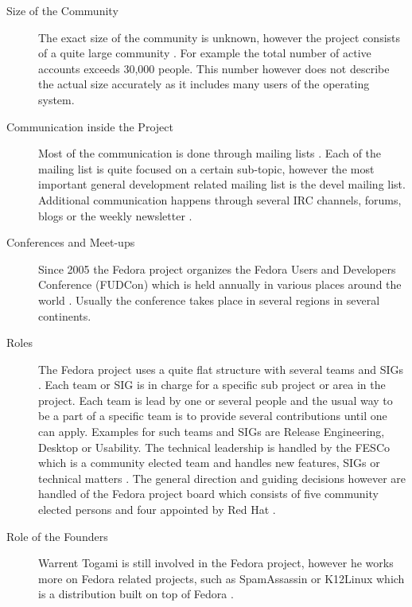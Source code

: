 \begin{description}

  \item[Size of the Community] The exact size of the community is unknown,
    however the project consists of a quite large community
    \cite{FedoraStatistics}. For example the total number of active accounts
    exceeds 30,000 people. This number however does not describe the actual
    size accurately as it includes many users of the operating system.

  \item[Communication inside the Project] Most of the communication is done
    through mailing lists \cite{FedoraAbout,FedoraJoin,FedoraSIG}. Each of
    the mailing list is quite focused on a certain sub-topic, however the
    most important general development related mailing list is the devel
    mailing list. Additional communication happens through several \ac{IRC}
    channels, forums, blogs or the weekly newsletter
    \cite{FedoraFWN,FedoraCommunicating}.

  \item[Conferences and Meet-ups] Since 2005 the Fedora project organizes the
    Fedora Users and Developers Conference (FUDCon) which is held annually in
    various places around the world \cite{FedoraFUDCon}. Usually the
    conference takes place in several regions in several continents.

  \item[Roles] The Fedora project uses a quite flat structure with several
    teams and \acp{SIG} \cite{FedoraJoin,FedoraCommunicating,FedoraSIG}. Each
    team or \ac{SIG} is in charge for a specific sub project or area in the
    project. Each team is lead by one or several people and the usual way to
    be a part of a specific team is to provide several contributions until
    one can apply. Examples for such teams and \acp{SIG} are Release
    Engineering, Desktop or Usability. The technical leadership is handled by
    the \ac{FESCo} which is a community elected team and handles new
    features, \acp{SIG} or technical matters \cite{FedoraFESCo}. The general
    direction and guiding decisions however are handled of the Fedora project
    board which consists of five community elected persons and four appointed
    by Red Hat \cite{FedoraBoard}.

  \item[Role of the Founders] Warrent Togami is still involved in the Fedora
    project, however he works more on Fedora related projects, such as
    SpamAssassin or K12Linux which is a distribution built on top of Fedora
    \cite{FedoraTogami}.

\end{description}

